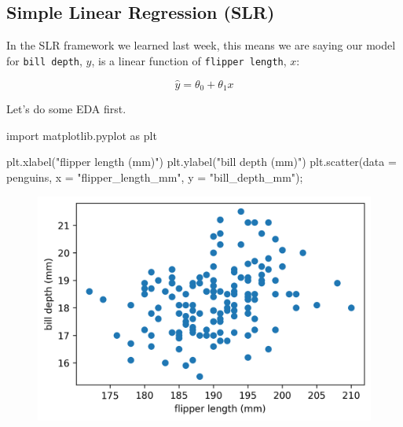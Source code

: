 \documentclass[
  letterpaper,
  DIV=11,
  numbers=noendperiod]{scrreprt}
\newenvironment{Shaded}{\begin{snugshade}}{\end{snugshade}}
\newcommand{\ImportTok}[1]{\textcolor[rgb]{0.00,0.46,0.62}{#1}}
\newcommand{\NormalTok}[1]{\textcolor[rgb]{0.00,0.23,0.31}{#1}}
\newcommand{\OperatorTok}[1]{\textcolor[rgb]{0.37,0.37,0.37}{#1}}
\newcommand{\StringTok}[1]{\textcolor[rgb]{0.13,0.47,0.30}{#1}}
\begin{document}
\hypertarget{simple-linear-regression-slr}{%
\subsection{Simple Linear Regression
(SLR)}\label{simple-linear-regression-slr}}

In the SLR framework we learned last week, this means we are saying our
model for \texttt{bill\ depth}, \(y\), is a linear function of
\texttt{flipper\ length}, \(x\):

\[\hat{y} = \theta_0 + \theta_1 x\]

Let's do some EDA first.

\begin{Shaded}
\begin{Highlighting}[]
\ImportTok{import}\NormalTok{ matplotlib.pyplot }\ImportTok{as}\NormalTok{ plt}

\NormalTok{plt.xlabel(}\StringTok{"flipper length (mm)"}\NormalTok{)}
\NormalTok{plt.ylabel(}\StringTok{"bill depth (mm)"}\NormalTok{)}
\NormalTok{plt.scatter(data }\OperatorTok{=}\NormalTok{ penguins, x }\OperatorTok{=} \StringTok{"flipper\_length\_mm"}\NormalTok{, y }\OperatorTok{=} \StringTok{"bill\_depth\_mm"}\NormalTok{)}\OperatorTok{;}
\end{Highlighting}
\end{Shaded}

\begin{figure}[H]

{\centering \includegraphics{gradient_descent/gradient_descent_files/figure-pdf/cell-4-output-1.png}

}

\end{figure}
\end{document}
